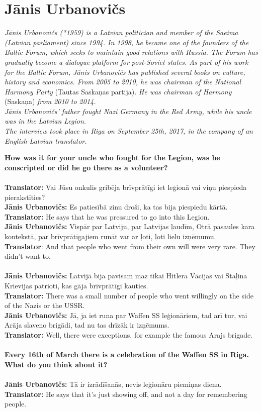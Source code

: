 \section{Jānis Urbanovičs}

\textit{Jānis Urbanovičs (*1959) is a Latvian politician and member of the Saeima (Latvian parliament) since 1994. In 1998, he became one of the founders of the Baltic Forum, which seeks to maintain good relations with Russia. The Forum has gradually become a dialogue platform for post-Soviet states. As part of his work for the Baltic Forum, Jānis Urbanovičs has published several books on culture, history and economics. From 2005 to 2010, he was chairman of the National Harmony Party} (Tautas Saskaņas partija). \textit{He was chairman of Harmony} (Saskaņa) \textit{from 2010 to 2014.\\
Jānis Urbanovičs’ father fought Nazi Germany in the Red Army, while his uncle was in the Latvian Legion.\\
The interview took place in Riga on September 25th, 2017, in the company of an English-Latvian translator.}\par
\vspace*{2em}
\textbf{How was it for your uncle who fought for the Legion, was he conscripted or did he go there as a volunteer?}\\
\\
\textbf{Translator:} Vai Jūsu onkulis gribēja brīvprātīgi iet leģionā vai viņu piespieda pierakstīties?\\
\textbf{Jānis Urbanovičs:} Es patiesībā zinu droši, ka tas bija piespiedu kārtā.\\
\textbf{Translator:} He says that he was pressured to go into this Legion.\\
\textbf{Jānis Urbanovičs:} Vispār par Latviju, par Latvijas ļaudīm, Otrā pasaules kara kontekstā, par brīvprātīgajiem runāt var ar ļoti, ļoti lielu izņēmumu.\\
\textbf{Translator}: And that people who went from their own will were very rare. They didn’t want to.\\
\\
\textbf{Jānis Urbanovičs:} Latvijā bija pavisam maz tikai Hitlera Vācijas vai Staļina Krievijas patrioti, kas gāja brīvprātīgi kauties. \\
\textbf{Translator:} There was a small number of people who went willingly on the side of the Nazis or the USSR.\\ 
\textbf{Jānis Urbanovičs:} Jā, ja iet runa par Waffen SS leģionāriem, tad arī tur, vai Arāja slaveno brigādi, tad nu tas drīzāk ir izņēmums.\\
\textbf{Translator:} Well, there were exceptions, for example the famous Arajs brigade.\\
\\
\textbf{Every 16th of March there is a celebration of the Waffen SS in Riga. What do you think about it?} \\
\\
\textbf{Jānis Urbanovičs:} Tā ir izrādīšanās, nevis leģionāru piemiņas diena.\\
\textbf{Translator:} He says that it’s just showing off, and not a day for remembering people.

